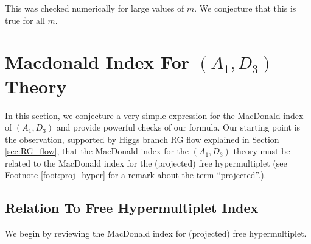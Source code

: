 \documentclass[a4paper,10pt]{article}
\newcommand{\C}{\mathds{C}}
\newcommand{\tsf}[1]{\textsf{#1}}
\newcommand{\mf}[1]{\mathfrak{#1}}
\newcommand{\myRed}[1]{\textcolor{red}{#1}}
\def\CV {{\cal V}}
\def\CS {{\cal S}}
\begin{document}
This was checked numerically for large values of $m$. 
We conjecture that this is true for all $m$. 
\section{Macdonald Index For $(A_1,D_{3})$ Theory}\label{sec:A1D3_Mac_conj}
In this section, we conjecture a very simple expression for the MacDonald index of $(A_1,D_3)$ and provide powerful checks of our formula. Our starting point is the observation, supported by Higgs branch \tsf{RG} flow explained in Section \ref{sec:RG_flow}, that the MacDonald index for the $(A_1,D_3)$ theory must be related to the MacDonald index for the (projected) free hypermultiplet (see Footnote \ref{foot:proj_hyper} for a remark about the term ``projected''.). 
\subsection{Relation To Free Hypermultiplet Index}\label{sec:D3_free_hyper_rel}
We begin by reviewing the MacDonald index for (projected) free hypermultiplet.
\end{document}
